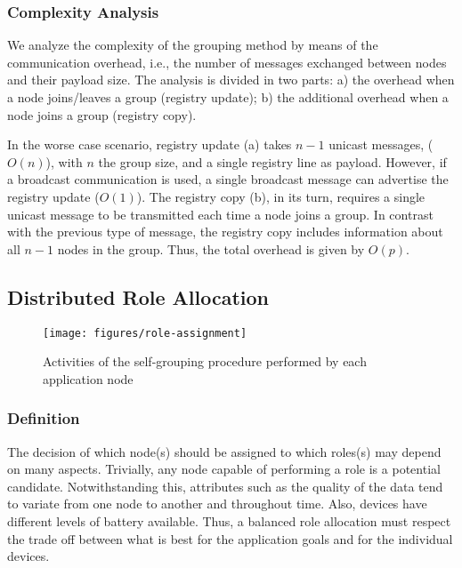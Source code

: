 
\subsubsection{\textbf{Complexity Analysis}} We analyze the complexity of the grouping method by means of the communication overhead, i.e., the number of messages exchanged between nodes and their payload size. The analysis is divided in two parts: a) the overhead when a node joins/leaves a group (registry update); b) the additional overhead when a node joins a group (registry copy).

In the worse case scenario, registry update (a) takes $n-1$ unicast messages, ($O(n)$), with $n$ the group size, and a single registry line as payload. However, if a broadcast communication is used, a single broadcast message can advertise the registry update ($O(1)$).
The registry copy (b), in its turn, requires a single unicast message to be transmitted each time a node joins a group. In contrast with the previous type of message, the registry copy includes information about all $n-1$ nodes in the group. Thus, the total overhead is given by $O(p)$.

 
\subsection{Distributed Role Allocation} 
 
\begin{figure}[t!]
	\centering
	\texttt{[image: figures/role-assignment]}
	\caption{Activities of the self-grouping procedure performed by each application node}
	\label{fig:self_grouping}
\end{figure}
 
\subsubsection{\textbf{Definition}} The decision of which node(s) should be assigned to which roles(s) may depend on many aspects. Trivially, any node capable of performing a role is a potential candidate. Notwithstanding this, attributes such as the quality of the data tend to variate from one node to another and throughout time. Also, devices have different levels of battery available. Thus, a balanced role allocation must respect the trade off between what is best for the application goals and for the individual devices. 

